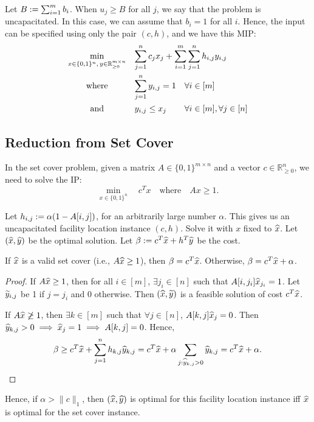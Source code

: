 \documentclass[a4paper,12pt,fleqn]{article}
\newcommand*{\Rpos}{\mathbb{R}_{\ge 0}}
\newcommand*{\optprog}[3]{
\begin{array}{{>{\displaystyle}c}*2{>{\displaystyle}l}}
#1 & \multicolumn{2}{>{\displaystyle}l}{#2}
#3 \end{array}}
\begin{document}
Let $B := \sum_{i=1}^m b_i$. When $u_j \ge B$ for all $j$,
we say that the problem is uncapacitated. In this case,
we can assume \wLoG{} that $b_i = 1$ for all $i$.
Hence, the input can be specified using only the pair $(c, h)$,
and we have this MIP:
\[ \optprog{\min_{x \in \{0, 1\}^n,\, y \in \Rpos^{m \times n}}}{%
\sum_{j=1}^n c_jx_j + \sum_{i=1}^m\sum_{j=1}^n h_{i,j}y_{i,j}}{
\\[1.5em] \textrm{where} & \sum_{j=1}^n y_{i,j} = 1 & \forall i \in [m]
\\[1.5em] \textrm{and} & y_{i,j} \le x_j & \forall i \in [m], \forall j \in [n]
} \]

\subsection{Reduction from Set Cover}

In the set cover problem, given a matrix $A \in \{0, 1\}^{m \times n}$ and a vector $c \in \Rpos^n$,
we need to solve the IP:
\[ \min_{x \in \{0, 1\}^n}\quad c^Tx\quad\textrm{where}\quad Ax \ge 1. \]

Let $h_{i,j} := \alpha(1 - A[i, j])$, for an arbitrarily large number $\alpha$.
This gives us an uncapacitated facility location instance $(c, h)$.
Solve it with $x$ fixed to $\widehat{x}$.
Let $(\widehat{x}, \widehat{y})$ be the optimal solution.
Let $\beta := c^T\widehat{x} + h^T\widehat{y}$ be the cost.

\begin{lemma}
If $\widehat{x}$ is a valid set cover (i.e., $A\widehat{x} \ge 1$), then $\beta = c^T\widehat{x}$.
Otherwise, $\beta = c^T\widehat{x} + \alpha$.
\end{lemma}
\begin{proof}
If $A\widehat{x} \ge 1$, then for all $i \in [m]$, $\exists j_i \in [n]$ such that
$A[i, j_i]\widehat{x}_{j_i} = 1$. Let $\widetilde{y}_{i,j}$ be 1 if $j = j_i$ and 0 otherwise.
Then $(\widehat{x}, \widetilde{y})$ is a feasible solution of cost $c^T\widehat{x}$.

If $A\widehat{x} \not\ge 1$, then $\exists k \in [m]$ such that $\forall j \in [n]$,
$A[k,j]\widehat{x}_j = 0$. Then $\widehat{y}_{k,j} > 0 \implies \widehat{x}_j = 1 \implies A[k,j] = 0$. Hence,
\[ \beta \ge c^T\widehat{x} + \sum_{j=1}^n h_{k,j}\widehat{y}_{k,j}
= c^T\widehat{x} + \alpha\sum_{j: \widehat{y}_{k,j} > 0} \widehat{y}_{k,j}
= c^T\widehat{x} + \alpha. \qedhere \]
\end{proof}

Hence, if $\alpha > \|c\|_1$, then $(\widehat{x}, \widehat{y})$ is optimal for this facility location instance
iff $\widehat{x}$ is optimal for the set cover instance.
\end{document}
